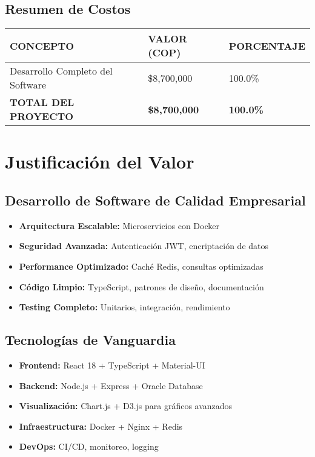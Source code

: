 \documentclass[12pt,a4paper]{article}
\begin{document}
\subsection{Resumen de Costos}

\begin{longtable}{|p{6cm}|p{2.5cm}|p{2.5cm}|}
\hline
\rowcolor{headerblue}
\textbf{\color{white}CONCEPTO} & \textbf{\color{white}VALOR (COP)} & \textbf{\color{white}PORCENTAJE} \\
\hline
\endhead

Desarrollo Completo del Software & \$8,700,000 & 100.0\% \\
\hline
\rowcolor{lightgray}
\textbf{TOTAL DEL PROYECTO} & \textbf{\$8,700,000} & \textbf{100.0\%} \\
\hline
\end{longtable}

\section{Justificación del Valor}

\subsection{Desarrollo de Software de Calidad Empresarial}

\begin{itemize}
    \item \textbf{Arquitectura Escalable:} Microservicios con Docker
    \item \textbf{Seguridad Avanzada:} Autenticación JWT, encriptación de datos
    \item \textbf{Performance Optimizado:} Caché Redis, consultas optimizadas
    \item \textbf{Código Limpio:} TypeScript, patrones de diseño, documentación
    \item \textbf{Testing Completo:} Unitarios, integración, rendimiento
\end{itemize}

\subsection{Tecnologías de Vanguardia}

\begin{itemize}
    \item \textbf{Frontend:} React 18 + TypeScript + Material-UI
    \item \textbf{Backend:} Node.js + Express + Oracle Database
    \item \textbf{Visualización:} Chart.js + D3.js para gráficos avanzados
    \item \textbf{Infraestructura:} Docker + Nginx + Redis
    \item \textbf{DevOps:} CI/CD, monitoreo, logging
\end{itemize}
\end{document}
